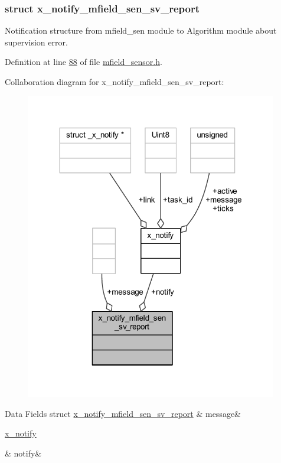 \subsubsection{struct x\+\_\+notify\+\_\+mfield\+\_\+sen\+\_\+sv\+\_\+report}
Notification structure from mfield\+\_\+sen module to Algorithm module about supervision error. 

Definition at line \hyperlink{a00019_source_l00088}{88} of file \hyperlink{a00019_source}{mfield\+\_\+sensor.\+h}.



Collaboration diagram for x\+\_\+notify\+\_\+mfield\+\_\+sen\+\_\+sv\+\_\+report\+:\nopagebreak
\begin{figure}[H]
\begin{center}
\leavevmode
\includegraphics[width=311pt]{dc/da0/a00951}
\end{center}
\end{figure}
\begin{DoxyFields}{Data Fields}
\hypertarget{a00019_a946af134546e64739ccfd37633480dc2}{struct \hyperlink{a00019_d7/d49/a00863}{x\+\_\+notify\+\_\+mfield\+\_\+sen\+\_\+sv\+\_\+report}}\label{a00019_a946af134546e64739ccfd37633480dc2}
&
message&
\\
\hline

\hypertarget{a00019_a8e6a04c2283f9fd7b8dcbc62faba5847}{\hyperlink{a00036_df/d4c/a00851}{x\+\_\+notify}}\label{a00019_a8e6a04c2283f9fd7b8dcbc62faba5847}
&
notify&
\\
\hline

\end{DoxyFields}
\label{df/d0c/a00788}
\hypertarget{a00019_df/d0c/a00788}{}
